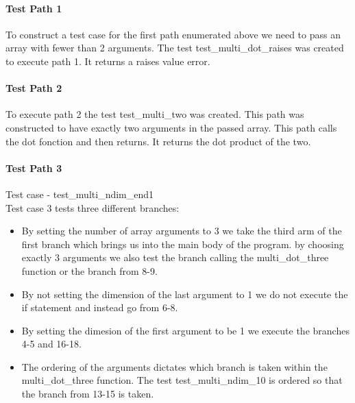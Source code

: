 \paragraph{Test Path 1}

To construct a test case for the first path enumerated above we need to pass an array with fewer than 2 arguments. 
The test test\_multi\_dot\_raises was created to execute path 1. It returns a raises value error.


\paragraph{Test Path 2}
To execute path 2 the test test\_multi\_two was created. This path was constructed to have exactly two arguments in the passed array.
This path calls the dot fonction and then returns. It returns the dot product of the two.


\paragraph{Test Path 3}
Test case - test\_multi\_ndim\_end1\\
Test case 3 tests three different branches:\\
\begin{itemize}
\item By setting the number of array arguments to 3 we take the third arm of the first branch which brings us into the main body of the program. by choosing exactly 3 arguments we also test the branch calling the multi\_dot\_three function or the branch from 8-9.
\item By not setting the dimension of the last argument to 1 we do not execute the if statement and instead go from 6-8.
\item By setting the dimesion of the first argument to be 1 we execute the branches 4-5 and 16-18.
\item The ordering of the arguments dictates which branch is taken within the multi\_dot\_three function. The test test\_multi\_ndim\_10 is ordered so that the branch from 13-15 is taken. 
\end{itemize}


